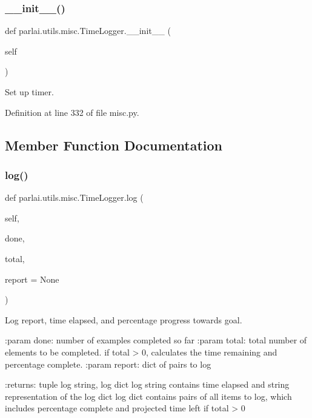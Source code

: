 \subsubsection{\texorpdfstring{\+\_\+\+\_\+init\+\_\+\+\_\+()}{\_\_init\_\_()}}
{\footnotesize\ttfamily def parlai.\+utils.\+misc.\+Time\+Logger.\+\_\+\+\_\+init\+\_\+\+\_\+ (\begin{DoxyParamCaption}\item[{}]{self }\end{DoxyParamCaption})}

\begin{DoxyVerb}Set up timer.\end{DoxyVerb}
 

Definition at line 332 of file misc.\+py.



\subsection{Member Function Documentation}
\mbox{\label{classparlai_1_1utils_1_1misc_1_1TimeLogger_a52458d882781ad6a6cbcea479ff495de}} 
\subsubsection{\texorpdfstring{log()}{log()}}
{\footnotesize\ttfamily def parlai.\+utils.\+misc.\+Time\+Logger.\+log (\begin{DoxyParamCaption}\item[{}]{self,  }\item[{}]{done,  }\item[{}]{total,  }\item[{}]{report = {\ttfamily None} }\end{DoxyParamCaption})}

\begin{DoxyVerb}Log report, time elapsed, and percentage progress towards goal.

:param done: number of examples completed so far
:param total: total number of elements to be completed. if total > 0,
      calculates the time remaining and percentage complete.
:param report: dict of pairs to log

:returns: tuple log string, log dict
    log string contains time elapsed and string representation of
    the log dict
    log dict contains pairs of all items to log, which includes
    percentage complete and projected time left if total > 0
\end{DoxyVerb}
 

